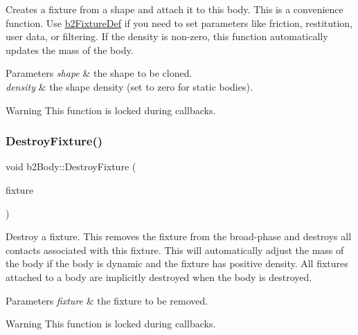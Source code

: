 Creates a fixture from a shape and attach it to this body. This is a convenience function. Use \hyperlink{structb2FixtureDef}{b2\+Fixture\+Def} if you need to set parameters like friction, restitution, user data, or filtering. If the density is non-\/zero, this function automatically updates the mass of the body. 
\begin{DoxyParams}{Parameters}
{\em shape} & the shape to be cloned. \\
\hline
{\em density} & the shape density (set to zero for static bodies). \\
\hline
\end{DoxyParams}
\begin{DoxyWarning}{Warning}
This function is locked during callbacks. 
\end{DoxyWarning}
\mbox{\label{classb2Body_a856d1df86b7bded91f02d8cfcaea1c2f}} 
\subsubsection{\texorpdfstring{Destroy\+Fixture()}{DestroyFixture()}\hspace{0.1cm}{\footnotesize\ttfamily [1/2]}}
{\footnotesize\ttfamily void b2\+Body\+::\+Destroy\+Fixture (\begin{DoxyParamCaption}\item[{\hyperlink{classb2Fixture}{b2\+Fixture} $\ast$}]{fixture }\end{DoxyParamCaption})}

Destroy a fixture. This removes the fixture from the broad-\/phase and destroys all contacts associated with this fixture. This will automatically adjust the mass of the body if the body is dynamic and the fixture has positive density. All fixtures attached to a body are implicitly destroyed when the body is destroyed. 
\begin{DoxyParams}{Parameters}
{\em fixture} & the fixture to be removed. \\
\hline
\end{DoxyParams}
\begin{DoxyWarning}{Warning}
This function is locked during callbacks. 
\end{DoxyWarning}
\mbox{\label{classb2Body_a856d1df86b7bded91f02d8cfcaea1c2f}} 
